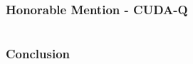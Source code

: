 \documentclass[aspectratio=169]{beamer}
\begin{document}
\begin{frame}
    \frametitle{Honorable Mention - CUDA-Q}
    \begin{columns}
        \begin{column}{0.5\textwidth}
            
        \end{column}
        \begin{column}{0.5\textwidth}
            
        \end{column}
    \end{columns}
\end{frame}

\begin{frame}
    \frametitle{Conclusion}

    

\end{frame}
\end{document}
